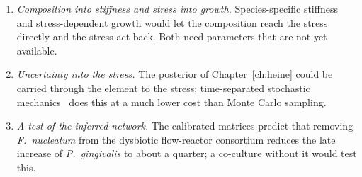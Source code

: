 \begin{enumerate}
        changes by up to $8\,\%$.
  \item \emph{Composition into stiffness and stress into growth.} Species-specific
        stiffness and stress-dependent growth would let the composition reach
        the stress directly and the stress act back. Both need parameters that
        are not yet available.
  \item \emph{Uncertainty into the stress.} The posterior of
        Chapter~\ref{ch:heine} could be carried through the element to the
        stress; time-separated stochastic mechanics~\cite{GeislerJunker2025TSM}
        does this at a much lower cost than Monte Carlo sampling.
  \item \emph{A test of the inferred network.} The calibrated matrices predict
        that removing \textit{F.~nucleatum} from the dysbiotic flow-reactor
        consortium reduces the late increase of \textit{P.~gingivalis} to
        about a quarter; a co-culture without it would test this.
\end{enumerate}
